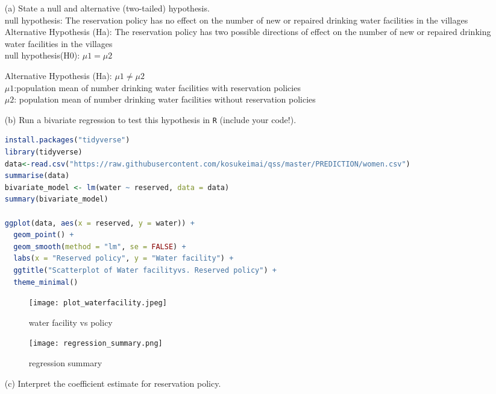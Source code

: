 \documentclass[12pt,letterpaper]{article}
\begin{document}
\newpage
\begin{enumerate}
	\item [(a)] State a null and alternative (two-tailed) hypothesis.\\ 
 
	null hypothesis: The reservation policy has no effect on the number of new or repaired drinking water facilities in the villages \\
 
       Alternative Hypothesis (Ha): The reservation policy has two possible directions of  effect on the number of new or repaired drinking water facilities in the villages\\
       
        null hypothesis(H0):  $\mu1=\mu2$

 Alternative Hypothesis (Ha): $\mu1\ne\mu2$\\
$\mu1$:population mean of number drinking water facilities with reservation policies\\
$\mu2$: population mean of number drinking water facilities without reservation policies
\vspace{6cm}
	\item [(b)] Run a bivariate regression to test this hypothesis in \texttt{R} (include your code!).
\begin{lstlisting}[language=R] 
install.packages("tidyverse") 
library(tidyverse) 
data<-read.csv("https://raw.githubusercontent.com/kosukeimai/qss/master/PREDICTION/women.csv")
summarise(data)
bivariate_model <- lm(water ~ reserved, data = data)
summary(bivariate_model)

ggplot(data, aes(x = reserved, y = water)) +
  geom_point() +
  geom_smooth(method = "lm", se = FALSE) +
  labs(x = "Reserved policy", y = "Water facility") +
  ggtitle("Scatterplot of Water facilityvs. Reserved policy") +
  theme_minimal()
\end{lstlisting} 
\newpage
  \begin{figure}[htp]
    \centering
    \texttt{[image: plot\_waterfacility.jpeg]}
    \caption{ water facility vs policy }
    \label{plot: water facility vs policy}
\end{figure}

\begin{figure}[htp]
    \centering
    \texttt{[image: regression\_summary.png]}
    \caption{ regression summary}
    \label{regression summary}
\end{figure}
	\vspace{6cm}
	\item [(c)] Interpret the coefficient estimate for reservation policy. 


\end{enumerate}
\end{document}
